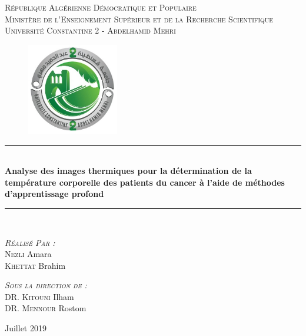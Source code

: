 \documentclass[12pt]{article}
\newcommand{\HRule}{\rule{\linewidth}{0.5mm}}
\begin{document}
\begin{titlepage}
	\begin{sffamily}
		\begin{center}
		\textsc{République Algérienne Démocratique et Populaire\\Ministère de l'Enseignement Supérieur et de la Recherche Scientifique\\Université Constantine 2 - Abdelhamid Mehri}\\[0.5 cm]			\begin{figure}[h]
			\centering
			\includegraphics[height=4cm,width=4cm]{Logo/logo.jpg}
		\end{figure}
		
		 \HRule \\[0.2cm]
		 
    { \huge \bfseries Analyse des images thermiques pour la détermination de la température corporelle des patients du cancer à l'aide de méthodes d'apprentissage profond\\[0.2cm] }
    \HRule \\[4cm]
    
    
        \begin{minipage}{0.4\textwidth}
      \begin{flushleft} \large
      	\emph{\textsc{Réalisé Par :}}\\
		\textsc{Nezli} Amara\\
        \textsc{Khettat} Brahim\\
      \end{flushleft}
    \end{minipage}
    \begin{minipage}{0.4\textwidth}
      \begin{flushright} \large
        \emph{\textsc{Sous la direction de :}}\\ \textsc{DR}. \textsc{Kitouni} Ilham\\
        												\textsc{DR}. \textsc{Mennour} Rostom
      \end{flushright}
    \end{minipage}

    \vfill

    {\large Juillet 2019}
		\end{center}
	\end{sffamily}
\end{titlepage}
\end{document}
